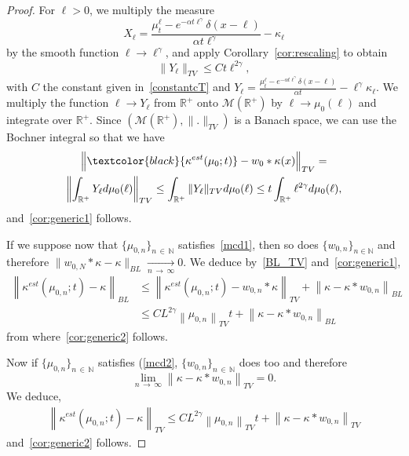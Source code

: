 \documentclass[AHL,Unicode,longabstracts,published]{cedram}
\newcommand*\dst{\displaystyle}
\renewcommand*\a{\alpha}
\newcommand*\R{\mathbb{R}}
\newcommand*\M{\mathcal{M}}
\newcommand*\N{\mathbb{N}}
\newcommand{\Mig}[1]{{\textcolor{black}{#1}}}
\begin{document}
\begin{proof}
For $\ell>0$, we multiply the measure
\begin{equation*}
X_{\ell}= \dfrac{\mu_t^{\ell} - e^{-\a t\ell^{\gamma}} \delta(x-\ell) }{\a t \ell^{\gamma}} - \kappa_{\ell}
\end{equation*}
by the smooth function $\ell \to \ell^{\gamma}$, and apply Corollary~\ref{cor:rescaling} to obtain
\begin{equation*}
\|Y_{\ell}\|_{TV}\leq C t \ell^{2\gamma},
\end{equation*}
with $C$ the constant given in~\eqref{constantcT} and $Y_{\ell}= \frac{\mu_t^{\ell} - e^{-\a t\ell^{\gamma}} \delta(x-\ell) }{\a t} - \ell^{\gamma}\kappa_{\ell}$. We multiply the function $\ell \to Y_{\ell}$ from $\R^+$ onto $\M(\R^+)$ by $\ell \to \mu_0(\ell)$ and integrate over $\R^+$. Since $\left(\M(\R^+), \|.\|_{TV}\right)$ is a Banach space, we can use the Bochner integral so that we have
\begin{multline*}
\Big\|\Mig{\kappa^{est}(\mu _0; t)}-w_0\ast\kappa (x)\Big\|_{TV} =\\
\left\| \dst\int_{\R^+} Y_{\ell} d\mu _0(\ell) \right\|_{TV} 
 \leq \dst\int_{\R^+} \|Y_{\ell}\|_{TV} d\mu _0(\ell)
\le t \dst\int_{\R^+}\ell^{2\gamma} d \mu _0(\ell),
\end{multline*}
and~\eqref{cor:generic1} follows.

If we suppose now that $\{\mu _{0, n}\}_{n\,\in\,\N}$ satisfies~\eqref{mcd1}, then so does $\{w _{0, n}\}_{n\in \N}$ and therefore $\|w_{0, N}\ast \kappa -\kappa \|_{BL} \underset{n\,\to\,\infty}{ \longrightarrow}0$. We deduce by~\eqref{BL_TV} and~\eqref{cor:generic1},
\begin{align*}
\left\| \kappa^{est}(\mu _{ 0, n }; t)-\kappa \right\| _{ BL }& \le \left\| \kappa^{est}(\mu _{ 0, n }; t)-w_{0, n}\ast \kappa \right\| _{ TV }+\left\|\kappa -\kappa \ast w _{ 0, n }\right\| _{ BL }\\
&\le CL^{2\gamma }\left\|\mu _{ 0, n }\right\| _{ TV }t +\left\|\kappa -\kappa \ast w _{ 0, n }\right\| _{ BL }
\end{align*}
from where~\eqref{cor:generic2} follows.

Now if $\{\mu _{0, n}\}_{n\,\in\,\N}$ satisfies (\eqref{mcd2}, $\{w _{0, n}\}_{n\,\in\,\N}$ does too and therefore
\begin{equation*}
\lim _{n\,\to\,\infty }\left\|\kappa -\kappa \ast w _{ 0, n }\right\| _{ TV }=0.
\end{equation*}
We deduce,
\begin{align*}
\left\| \kappa^{est}(\mu _{ 0, n }; t)-\kappa \right\| _{ TV } \le C L^{2\gamma }\left\|\mu _{ 0, n }\right\| _{ TV }t +\left\|\kappa -\kappa \ast w _{ 0, n }\right\| _{ TV }
\end{align*}
and~\eqref{cor:generic2} follows.
\end{proof}
\end{document}

